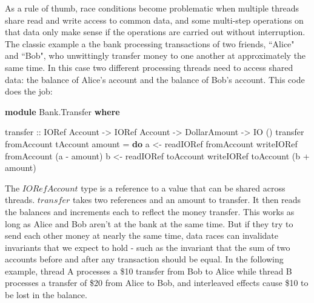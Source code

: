 \documentclass[]{article}
\newenvironment{Shaded}{}{}
\newcommand{\KeywordTok}[1]{\textcolor[rgb]{0.00,0.44,0.13}{\textbf{{#1}}}}
\newcommand{\DataTypeTok}[1]{\textcolor[rgb]{0.56,0.13,0.00}{{#1}}}
\newcommand{\OtherTok}[1]{\textcolor[rgb]{0.00,0.44,0.13}{{#1}}}
\newcommand{\FunctionTok}[1]{\textcolor[rgb]{0.02,0.16,0.49}{{#1}}}
\newcommand{\NormalTok}[1]{{#1}}
\begin{document}
As a rule of thumb, race conditions become problematic when multiple
threads share read and write access to common data, and some multi-step
operations on that data only make sense if the operations are carried
out without interruption. The classic example a the bank processing
transactions of two friends, ``Alice" and ``Bob", who unwittingly
transfer money to one another at approximately the same time. In this
case two different processing threads need to access shared data: the
balance of Alice's account and the balance of Bob's account. This code
does the job:

\singlespacing

\begin{Shaded}
\begin{Highlighting}[]
\KeywordTok{module} \DataTypeTok{Bank.Transfer} \KeywordTok{where}

\OtherTok{transfer ::} \DataTypeTok{IORef} \DataTypeTok{Account} \OtherTok{->} \DataTypeTok{IORef} \DataTypeTok{Account} \OtherTok{->} \DataTypeTok{DollarAmount} \OtherTok{->} \DataTypeTok{IO} \NormalTok{()}
\NormalTok{transfer fromAccount tAccount amount }\FunctionTok{=} \KeywordTok{do}
  \NormalTok{a }\OtherTok{<-} \NormalTok{readIORef fromAccount}
  \NormalTok{writeIORef fromAccount (a }\FunctionTok{-} \NormalTok{amount)}
  \NormalTok{b }\OtherTok{<-} \NormalTok{readIORef toAccount}
  \NormalTok{writeIORef toAccount (b }\FunctionTok{+} \NormalTok{amount)}
\end{Highlighting}
\end{Shaded}

\doublespacing

The \(IORef Account\) type is a reference to a value that can be shared
across threads. \(transfer\) takes two references and an amount to
transfer. It then reads the balances and increments each to reflect the
money transfer. This works as long as Alice and Bob aren't at the bank
at the same time. But if they try to send each other money at nearly the
same time, data races can invalidate invariants that we expect to hold -
such as the invariant that the sum of two accounts before and after any
transaction should be equal. In the following example, thread A
processes a \$10 transfer from Bob to Alice while thread B processes a
transfer of \$20 from Alice to Bob, and interleaved effects cause \$10
to be lost in the balance.

\singlespacing
\end{document}
